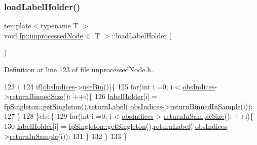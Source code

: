 \subsubsection{\texorpdfstring{load\+Label\+Holder()}{loadLabelHolder()}}
{\footnotesize\ttfamily template$<$typename T $>$ \\
void \hyperlink{classfp_1_1unprocessedNode}{fp\+::unprocessed\+Node}$<$ T $>$\+::load\+Label\+Holder (\begin{DoxyParamCaption}{ }\end{DoxyParamCaption})\hspace{0.3cm}{\ttfamily [inline]}}



Definition at line 123 of file unprocessed\+Node.\+h.


\begin{DoxyCode}
123                                              \{
124                     \textcolor{keywordflow}{if}(\hyperlink{classfp_1_1unprocessedNode_aea171244695a3a099061188a9553e525}{obsIndices}->\hyperlink{classfp_1_1stratifiedInNodeClassIndices_af740a8054cefe977f8f1288fc6b39109}{useBin}())\{
125                         \textcolor{keywordflow}{for}(\textcolor{keywordtype}{int} i =0; i < \hyperlink{classfp_1_1unprocessedNode_aea171244695a3a099061188a9553e525}{obsIndices}->\hyperlink{classfp_1_1stratifiedInNodeClassIndices_a9f77fe5e638170c4ad4ce99541561cfc}{returnBinnedSize}(); ++i)\{
126                             \hyperlink{classfp_1_1unprocessedNode_a99524f9266d6fcf979f15ef445e629ca}{labelHolder}[i] = 
      \hyperlink{classfp_1_1fpSingleton_a8bdae77b68521003e3fc630edec2e240}{fpSingleton::getSingleton}().\hyperlink{classfp_1_1fpSingleton_aa2f644b1521948fb994f4087ddfaea14}{returnLabel}(
      \hyperlink{classfp_1_1unprocessedNode_aea171244695a3a099061188a9553e525}{obsIndices}->\hyperlink{classfp_1_1stratifiedInNodeClassIndices_a775d9a820b6f48ab44cd1ac4ffde1578}{returnBinnedInSample}(i));
127                         \}
128                     \}\textcolor{keywordflow}{else}\{
129                         \textcolor{keywordflow}{for}(\textcolor{keywordtype}{int} i =0; i < \hyperlink{classfp_1_1unprocessedNode_aea171244695a3a099061188a9553e525}{obsIndices}->
      \hyperlink{classfp_1_1stratifiedInNodeClassIndices_a596235ffec7250fabd2818d395b39c66}{returnInSampleSize}(); ++i)\{
130                             \hyperlink{classfp_1_1unprocessedNode_a99524f9266d6fcf979f15ef445e629ca}{labelHolder}[i] = 
      \hyperlink{classfp_1_1fpSingleton_a8bdae77b68521003e3fc630edec2e240}{fpSingleton::getSingleton}().\hyperlink{classfp_1_1fpSingleton_aa2f644b1521948fb994f4087ddfaea14}{returnLabel}(
      \hyperlink{classfp_1_1unprocessedNode_aea171244695a3a099061188a9553e525}{obsIndices}->\hyperlink{classfp_1_1stratifiedInNodeClassIndices_a2d7e802fb97db0367bb8e8f31d393afd}{returnInSample}(i));
131                         \}
132                     \}
133                 \}
\end{DoxyCode}
